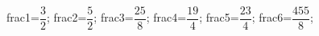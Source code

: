 \documentclass[exercice]{thedocument}%
\begin{document}
%
    \>frac1=$\dfrac32$;%
    \>frac2=$\dfrac52$;%
    \>frac3=$\dfrac{25}8$;%
    \>frac4=$\dfrac{19}4$;%
    \>frac5=$\dfrac{23}4$;%
    \>frac6=$\dfrac{455}8$;%
\end{document}
